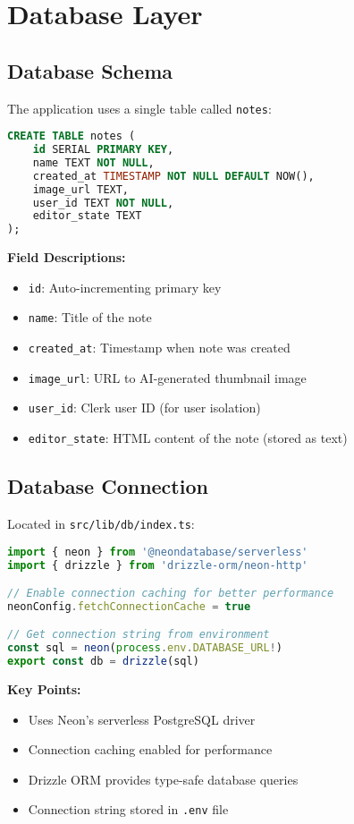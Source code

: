 \documentclass[11pt,a4paper]{article}
\begin{document}
\section{Database Layer}

\subsection{Database Schema}

The application uses a single table called \texttt{notes}:

\begin{lstlisting}[language=SQL]
CREATE TABLE notes (
    id SERIAL PRIMARY KEY,
    name TEXT NOT NULL,
    created_at TIMESTAMP NOT NULL DEFAULT NOW(),
    image_url TEXT,
    user_id TEXT NOT NULL,
    editor_state TEXT
);
\end{lstlisting}

\textbf{Field Descriptions:}
\begin{itemize}
    \item \texttt{id}: Auto-incrementing primary key
    \item \texttt{name}: Title of the note
    \item \texttt{created\_at}: Timestamp when note was created
    \item \texttt{image\_url}: URL to AI-generated thumbnail image
    \item \texttt{user\_id}: Clerk user ID (for user isolation)
    \item \texttt{editor\_state}: HTML content of the note (stored as text)
\end{itemize}

\subsection{Database Connection}

Located in \texttt{src/lib/db/index.ts}:

\begin{lstlisting}[language=JavaScript]
import { neon } from '@neondatabase/serverless'
import { drizzle } from 'drizzle-orm/neon-http'

// Enable connection caching for better performance
neonConfig.fetchConnectionCache = true

// Get connection string from environment
const sql = neon(process.env.DATABASE_URL!)
export const db = drizzle(sql)
\end{lstlisting}

\textbf{Key Points:}
\begin{itemize}
    \item Uses Neon's serverless PostgreSQL driver
    \item Connection caching enabled for performance
    \item Drizzle ORM provides type-safe database queries
    \item Connection string stored in \texttt{.env} file
\end{itemize}
\end{document}
